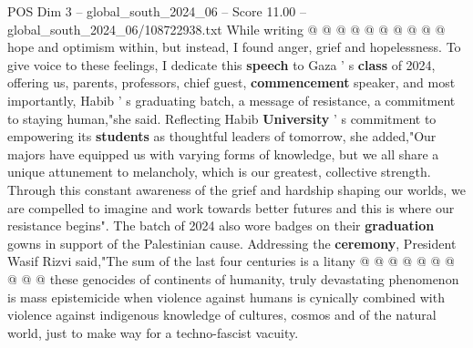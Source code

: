\begin{textsample}{POS Dim 3 – global\_south\_2024\_06 – Score 11.00 – global\_south\_2024\_06/108722938.txt}
While writing @ @ @ @ @ @ @ @ @ @ hope and optimism within, but instead, I found anger, grief and hopelessness.
To give voice to these feelings, I dedicate this \textbf{speech} to Gaza ' s \textbf{class} of 2024, offering us, parents, professors, chief guest, \textbf{commencement} speaker, and most importantly, Habib ' s graduating batch, a message of resistance, a commitment to staying human,"she said.
Reflecting Habib \textbf{University} ' s commitment to empowering its \textbf{students} as thoughtful leaders of tomorrow, she added,"Our majors have equipped us with varying forms of knowledge, but we all share a unique attunement to melancholy, which is our greatest, collective strength.
Through this constant awareness of the grief and hardship shaping our worlds, we are compelled to imagine and work towards better futures and this is where our resistance begins".
The batch of 2024 also wore badges on their \textbf{graduation} gowns in support of the Palestinian cause.
Addressing the \textbf{ceremony}, President Wasif Rizvi said,"The sum of the last four centuries is a litany @ @ @ @ @ @ @ @ @ @ these genocides of continents of humanity, truly devastating phenomenon is mass epistemicide when violence against humans is cynically combined with violence against indigenous knowledge of cultures, cosmos and of the natural world, just to make way for a techno-fascist vacuity.

\end{textsample}
